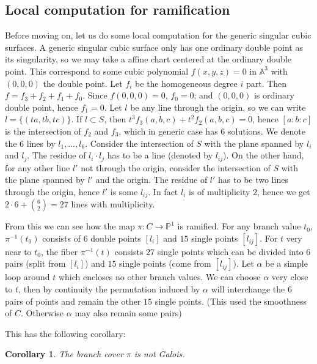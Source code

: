 \documentclass{article}
\newtheorem{corollary}[theorem]{Corollary}
\begin{document}
\subsection{Local computation for ramification}\label{generic_singular}
Before moving on, let us do some local computation for the generic singular cubic surfaces. A generic singular cubic surface only has one ordinary double point as its singularity, so we may take a affine chart centered at the ordinary double point. This correspond to some cubic polynomial $f(x,y,z)=0$ in $\mathbb A^3$ with $(0,0,0)$ the double point. Let $f_i$ be the homogeneous degree $i$ part. Then $f=f_3+f_2+f_1+f_0$. Since $f(0,0,0)=0$, $f_0=0$; and $(0,0,0)$ is ordinary double point, hence  $f_1=0$. Let $l$ be any line through the origin, so we can write $l=\{(ta,tb,tc)\}$. If $l\subset S$, then $t^3f_3(a,b,c)+t^2f_2(a,b,c)=0$, hence $[a:b:c]$ is the intersection of $f_2$ and $f_3$, which in generic case has $6$ solutions. We denote the $6$ lines by $l_1,\ldots,l_6$. Consider the intersection of $S$ with the plane spanned by $l_i$ and $l_j$. The residue of $l_i \cdot l_j$ has to be a line (denoted by $l_{ij}$). On the other hand, for any other line $l'$ not through the origin, consider the intersection of $S$ with the plane spanned by $l'$ and the origin. The residue of $l'$ has to be two lines through the origin, hence $l'$ is some $l_{ij}$. In fact $l_i$ is of multiplicity $2$, hence we get $2\cdot 6+\binom{6}{2}=27$ lines with multiplicity.

From this we can see how the map $\pi\colon C\to \mathbb P^1$ is  ramified. For any branch value $t_0$, $\pi^{-1}(t_0)$ consists of $6$ double points $[l_i]$ and $15$ single points $[l_{ij}]$. For $t$  very near to $t_0$, the fiber $\pi^{-1}(t)$ consists $27$ single points which can be divided into $6$ pairs (split from $[l_i]$) and $15$ single points (come from $[l_{ij}]$). Let $\alpha$ be a simple loop around $t$ which encloses no other branch values. We can choose $\alpha$ very close to $t$, then by continuity the permutation induced by $\alpha$ will interchange the $6$ pairs of points and remain the other $15$ single points. (This used the smoothness of $C$. Otherwise $\alpha$ may also remain some pairs)

This has the following corollary:

\begin{corollary}
The branch cover $\pi$ is not Galois.
\end{corollary}
\end{document}
